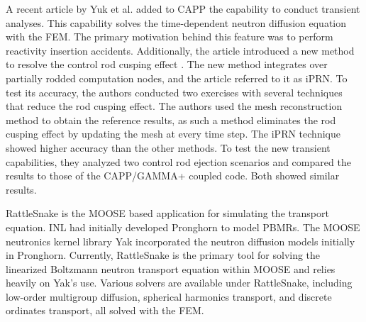A recent article by Yuk et al. \cite{yuk_time-dependent_2020} added to CAPP the capability to conduct transient analyses.
This capability solves the time-dependent neutron diffusion equation with the \gls{FEM}.
The primary motivation behind this feature was to perform reactivity insertion accidents.
Additionally, the article introduced a new method to resolve the control rod cusping effect \cite{joo_resolution_1984}.
The new method integrates over partially rodded computation nodes, and the article referred to it as iPRN.
To test its accuracy, the authors conducted two exercises with several techniques that reduce the rod cusping effect.
The authors used the mesh reconstruction method to obtain the reference results, as such a method eliminates the rod cusping effect by updating the mesh at every time step.
The iPRN technique showed higher accuracy than the other methods.
To test the new transient capabilities, they analyzed two control rod ejection scenarios and compared the results to those of the CAPP/GAMMA+ coupled code.
Both showed similar results.

RattleSnake \cite{wang_rattlesnake_2019} is the MOOSE \cite{gaston_moose_2009} based application for simulating the transport equation.
\gls{INL} had initially developed Pronghorn \cite{strydom_inl_2013} to model \glspl{PBMR}.
The MOOSE neutronics kernel library Yak incorporated the neutron diffusion models initially in Pronghorn.
Currently, RattleSnake is the primary tool for solving the linearized Boltzmann neutron transport equation within MOOSE and relies heavily on Yak's use.
Various solvers are available under RattleSnake, including low-order multigroup diffusion, spherical harmonics transport, and discrete ordinates transport, all solved with the \gls{FEM}.

